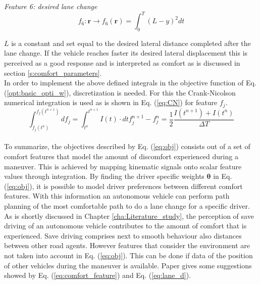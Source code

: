 \textit{Feature 6: desired lane change}
\begin{equation}\label{eq:des_lane_change}
f_{6}:\bm{r}\xrightarrow{}f_6(\bm{r})=\int_{0}^{T}(L-y)^2 dt
\end{equation}

$L$ is a constant and set equal to the desired lateral distance completed after the lane change. If the vehicle reaches faster its desired lateral displacement this is perceived as a good response and is interpreted as comfort as is discussed in section \ref{s:comfort_parameters}.
\\


In order to implement the above defined integrals in the objective function of Eq. (\ref{opt:basic_opti_w}), discretization is needed. For this the Crank-Nicolson numerical integration is used as is shown in Eq. (\ref{eq:CN}) for feature $f_j$. 
\begin{subequations}\label{eq:CN}
	\begin{equation}
	\int_{f_j(t^n)}^{f_j(t^{n+1})}df_j=\int_{t^n}^{t^{n+1}} I(t) \cdot dt	
	\end{equation}
	\begin{equation}
	f_j^{n+1} -f_j^{n} = \frac{1}{2}\frac{I(t^{n+1})+I(t^n)}{\Delta T}
	\end{equation}
\end{subequations}\\

To summarize, the objectives described by Eq. (\ref{eq:obj}) consists out of a set of comfort features that model the amount of discomfort experienced during a maneuver. This is achieved by mapping kinematic signals onto scalar feature values through integration. By finding the driver specific weights $\bm{\theta}$ in Eq. (\ref{eq:obj}), it is possible to model driver preferences between different comfort features. With this information an autonomous vehicle can perform path planning of the most comfortable path to do a lane change for a specific driver. As is shortly discussed in Chapter \ref{cha:Literature_study}, the perception of save driving of an autonomous vehicle contributes to the amount of comfort that is experienced. Save driving comprises next to smooth behaviour also distances between other road agents. However features that consider the environment are not taken into account in Eq. (\ref{eq:obj}). This can be done if data of the position of other vehicles during the maneuver is available. Paper \cite{Kuderer2015a} gives some suggestions showed by Eq. (\ref{eq:comfort_feature}) and  Eq. (\ref{eq:lane_d}).  
\newpage

